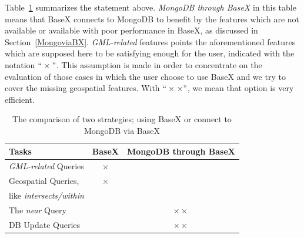 \documentclass[a4paper,12pt]{article}
\begin{document}


Table~\ref{t.comparisonBaseXMongo} summarizes the statement above. \textit{MongoDB through BaseX} in this table means that BaseX connects to MongoDB to benefit by the features which are not available or available with poor performance in BaseX, as discussed in Section~\ref{MongoviaBX}. \textit{GML-related} features points the aforementioned features which are supposed here to be satisfying enough for the user, indicated with the notation $``\times"$. This assumption is made in order to concentrate on the evaluation of those cases in which the user choose to use BaseX and we try to cover the missing geospatial features.
With $``\times\times"$, we mean that option is very efficient.
\begin{table}
\centering
\begin{tabular}{|l | c | c|}\hline
\textbf{Tasks} & \textbf{BaseX} & \textbf{MongoDB through BaseX}\\\hline
 \textit{GML-related} Queries & $\times$ &\\\hline
 Geospatial Queries,  & $\times$ &\\
like \textit{intersects/within} & & \\\hline
 The \textit{near} Query & &$\times\times$ \\\hline
 DB Update Queries & &$\times\times$ 
\\\hline
\end{tabular}
\caption{The comparison of two strategies; using BaseX or connect to MongoDB via BaseX}
\label{t.comparisonBaseXMongo}
\end{table}
\end{document}
